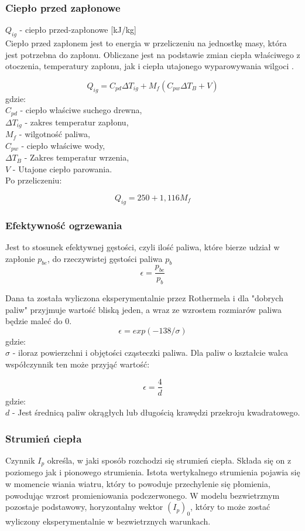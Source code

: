 \documentclass[a4paper, 11pt]{article}
\begin{document}
	\subsubsection{Ciepło przed zapłonowe}	
	
	$Q_{ig}$	- 	ciepło przed-zapłonowe	[kJ/kg]\\
	Ciepło przed zapłonem jest to energia w przeliczeniu na jednostkę masy, która jest potrzebna do zapłonu. Obliczane jest na podstawie zmian ciepła właściwego z otoczenia, temperatury zapłonu, jak i ciepła utajonego wyparowywania wilgoci	.
	
	
	$$Q_{ig}=C_{pd}\Delta T_{ig} + M_{f}(C_{pw}\Delta T_{B}+V)$$
	gdzie:\\
	$C_{pd}$ - ciepło właściwe suchego drewna,\\
	$\Delta T_{ig}$ - zakres temperatur zapłonu,\\
	$M_{f}$ - wilgotność paliwa,\\
	$C_{pw}$ - ciepło właściwe wody,\\
	$\Delta T_{B}$ - Zakres temperatur wrzenia,\\
	$V$ - Utajone ciepło parowania.\\
	
	Po przeliczeniu:
	
	$$Q_{ig}=250+1,116M_{f}$$
	
	
	\subsubsection{Efektywność ogrzewania}
	
	Jest to stosunek efektywnej gęstości, czyli ilość paliwa, które bierze udział w zapłonie $p_{be}$, do rzeczywistej gęstości paliwa $p_{b}$
	$$\epsilon =  \frac{p_{be}}{p_{b}}$$
	
	Dana ta została wyliczona eksperymentalnie przez Rothermela i dla "dobrych paliw" przyjmuje wartość bliską jeden, a wraz ze wzrostem rozmiarów paliwa będzie maleć do $0$. 
	$$\epsilon=exp(-138/\sigma)$$ 
	gdzie:\\
	$\sigma$ - iloraz powierzchni i objętości cząsteczki paliwa. Dla paliw o kształcie walca współczynnik ten może przyjąć wartość:
	
	$$\epsilon=\frac{4}{d}$$ 
	gdzie:\\
	$d$ - Jest średnicą paliw okrągłych lub długością krawędzi przekroju kwadratowego.
	
	
	\subsubsection{Strumień ciepła}
	Czynnik $I_{p}$ określa, w jaki sposób rozchodzi się strumień ciepła. Składa się on z poziomego jak i pionowego strumienia. Istota wertykalnego strumienia pojawia się w momencie wiania wiatru, który to powoduje przechylenie się płomienia, powodując wzrost promieniowania podczerwonego. W modelu bezwietrznym pozostaje podstawowy, horyzontalny wektor $(I_{p})_{0}$, który to może zostać wyliczony eksperymentalnie w bezwietrznych warunkach.
	
\end{document}
